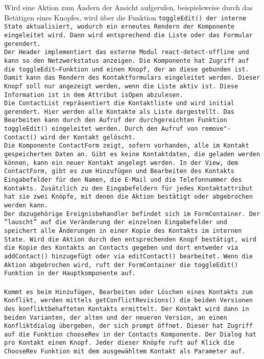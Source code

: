 Wird eine Aktion zum Ändern der Ansicht aufgerufen, beispielsweise durch das Betätigen eines Knopfes, wird über die Funktion \tt{toggleEdit()} der interne State aktualisiert, wodurch ein erneutes Rendern der Komponente eingeleitet wird. Dann wird entsprechend die Liste oder das Formular gerendert.\\
%
Der \tt{Header} implementiert das externe Modul \tt{react-detect-offline} und kann so den Netzwerkstatus anzeigen.
Die Komponente hat Zugriff auf die \tt{toggleEdit}--Funktion und einen Knopf, der an diese gebunden ist.
Damit kann das Rendern des Kontaktformulars eingeleitet werden.
Dieser Knopf soll nur angezeigt werden, wenn die Liste aktiv ist. Diese Information ist in dem Attribut \tt{isOpen} abzulesen.\\
Die \tt{ContactList} repräsentiert die Kontaktliste und wird initial gerendert. Hier werden alle Kontakte als Liste dargestellt.
Das Bearbeiten kann durch den Aufruf der durchgereichten Funktion \tt{toggleEdit()} eingeleitet werden.
Durch den Aufruf von \tt{remove"-Contact()} wird der Kontakt gelöscht.\\
%
Die Komponente \tt{ContactForm} zeigt, sofern vorhanden, alle im Kontakt gespeicherten Daten an.
Gibt es keine Kontaktdaten, die geladen werden können, kann ein neuer Kontakt angelegt werden.
In der View, dem \tt{ContactForm}, gibt es zum Hinzufügen und Bearbeiten des Kontakts Eingabefelder für den Namen, die E-Mail und die Telefonnummer des Kontakts.
Zusätzlich zu den Eingabefeldern für jedes Kontaktattribut hat sie zwei Knöpfe, mit denen die Aktion bestätigt oder abgebrochen werden kann.\\
Der dazugehörige Ereignisbehandler befindet sich im \tt{FormContainer}. 
Der ''lauscht'' auf die Veränderung der einzelnen Eingabefelder und speichert alle Änderungen in einer Kopie des Kontakts im internen State.
Wird die Aktion durch den entsprechenden Knopf bestätigt, wird die Kopie des Kontakts an \tt{Contacts} gegeben und dort entweder via \tt{addContact()} hinzugefügt oder via \tt{editContact()} bearbeitet.
Wenn die Aktion abgebrochen wird, ruft der \tt{FormContainer} die \tt{toggleEdit()} Funktion in der Hauptkomponente auf.\\\\
%
%
Kommt es beim Hinzufügen, Bearbeiten oder Löschen eines Kontakts zum Konflikt, werden mittels \tt{getConflictRevisions()} die beiden Versionen des konfliktbehafteten Kontakts ermittelt.
Der Kontakt wird dann in beiden Varianten, der alten und der neueren Version, an einen Konfliktdialog übergeben, der sich prompt öffnet. Dieser hat Zugriff auf die Funktion \tt{chooseRev} in der \tt{Contacts} Komponente. Der Dialog hat pro Kontakt einen Knopf. Jeder dieser Knöpfe ruft auf Klick die \tt{ChooseRev} Funktion mit dem ausgewähltem Kontakt als Parameter auf.
